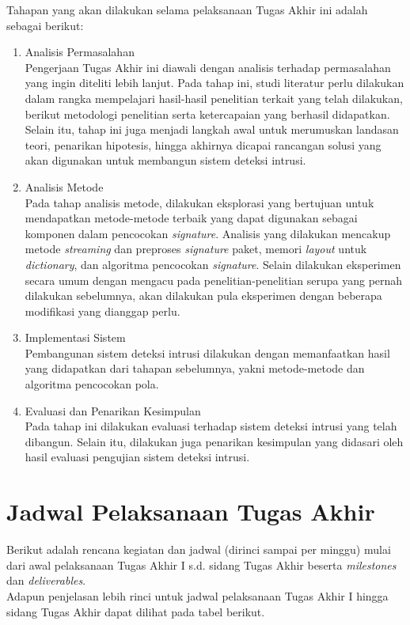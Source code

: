   Tahapan yang akan dilakukan selama pelaksanaan Tugas Akhir ini adalah sebagai berikut:
  \begin{enumerate}

      \item Analisis Permasalahan \\
      Pengerjaan Tugas Akhir ini diawali dengan analisis terhadap permasalahan yang ingin diteliti lebih lanjut. Pada tahap ini, studi literatur perlu dilakukan dalam rangka mempelajari hasil-hasil penelitian terkait yang telah dilakukan, berikut metodologi penelitian serta ketercapaian yang berhasil didapatkan. Selain itu, tahap ini juga menjadi langkah awal untuk merumuskan landasan teori, penarikan hipotesis, hingga akhirnya dicapai rancangan solusi yang akan digunakan untuk membangun sistem deteksi intrusi.

      \item Analisis Metode \\
      Pada tahap analisis metode, dilakukan eksplorasi yang bertujuan untuk mendapatkan metode-metode terbaik yang dapat digunakan sebagai komponen dalam pencocokan \emph{signature}. Analisis yang dilakukan mencakup metode \emph{streaming} dan preproses \emph{signature} paket, memori \emph{layout} untuk \emph{dictionary}, dan algoritma pencocokan \emph{signature}. Selain dilakukan eksperimen secara umum dengan mengacu pada penelitian-penelitian serupa yang pernah dilakukan sebelumnya, akan dilakukan pula eksperimen dengan beberapa modifikasi yang dianggap perlu.

      \item Implementasi Sistem \\
      Pembangunan sistem deteksi intrusi dilakukan dengan memanfaatkan hasil yang didapatkan dari tahapan sebelumnya, yakni metode-metode dan algoritma pencocokan pola.

      \item Evaluasi dan Penarikan Kesimpulan \\
      Pada tahap ini dilakukan evaluasi terhadap sistem deteksi intrusi yang telah dibangun. Selain itu, dilakukan juga penarikan kesimpulan yang didasari oleh hasil evaluasi pengujian sistem deteksi intrusi.

  \end{enumerate}

\section{Jadwal Pelaksanaan Tugas Akhir}

  Berikut adalah rencana kegiatan dan jadwal (dirinci sampai per minggu) mulai dari awal pelaksanaan Tugas Akhir I s.d. sidang Tugas Akhir beserta \emph{milestones} dan \emph{deliverables}. \\
  

  Adapun penjelasan lebih rinci untuk jadwal pelaksanaan Tugas Akhir I hingga sidang Tugas Akhir dapat dilihat pada tabel berikut. \\
  
